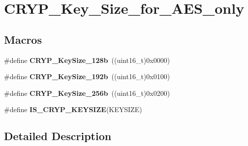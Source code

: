 \hypertarget{group___c_r_y_p___key___size__for___a_e_s__only}{\section{C\-R\-Y\-P\-\_\-\-Key\-\_\-\-Size\-\_\-for\-\_\-\-A\-E\-S\-\_\-only}
\label{group___c_r_y_p___key___size__for___a_e_s__only}
}
\subsection*{Macros}
\begin{DoxyCompactItemize}
\item 
\hypertarget{group___c_r_y_p___key___size__for___a_e_s__only_gacb2dbb80e15f19c40ed6718082e0dbdc}{\#define {\bfseries C\-R\-Y\-P\-\_\-\-Key\-Size\-\_\-128b}~((uint16\-\_\-t)0x0000)}\label{group___c_r_y_p___key___size__for___a_e_s__only_gacb2dbb80e15f19c40ed6718082e0dbdc}

\item 
\hypertarget{group___c_r_y_p___key___size__for___a_e_s__only_ga4da085b0764310a43cdcb5d2c9bc871e}{\#define {\bfseries C\-R\-Y\-P\-\_\-\-Key\-Size\-\_\-192b}~((uint16\-\_\-t)0x0100)}\label{group___c_r_y_p___key___size__for___a_e_s__only_ga4da085b0764310a43cdcb5d2c9bc871e}

\item 
\hypertarget{group___c_r_y_p___key___size__for___a_e_s__only_ga96e5c43517cc20077d01c25fb6045505}{\#define {\bfseries C\-R\-Y\-P\-\_\-\-Key\-Size\-\_\-256b}~((uint16\-\_\-t)0x0200)}\label{group___c_r_y_p___key___size__for___a_e_s__only_ga96e5c43517cc20077d01c25fb6045505}

\item 
\#define {\bfseries I\-S\-\_\-\-C\-R\-Y\-P\-\_\-\-K\-E\-Y\-S\-I\-Z\-E}(K\-E\-Y\-S\-I\-Z\-E)
\end{DoxyCompactItemize}


\subsection{Detailed Description}


